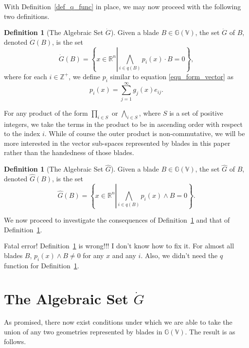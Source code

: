 \documentclass{birkjour}
\theoremstyle{definition}
\newtheorem{defn}[thm]{Definition}
\theoremstyle{remark}
\numberwithin{equation}{section}
\newcommand{\G}{\mathbb{G}}
\newcommand{\V}{\mathbb{V}}
\newcommand{\R}{\mathbb{R}}
\newcommand{\Z}{\mathbb{Z}}
\newcommand{\Gi}{\dot{G}}
\newcommand{\Go}{\hat{G}}
\begin{document}
With Definition~\ref{def_q_func} in place, we may now proceed with the following two definitions.

\begin{defn}[The Algebraic Set $\Gi$]\label{def_gi}
Given a blade $B\in\G(\V)$, the set $\Gi$ of $B$, denoted $\Gi(B)$, is the set
\begin{equation}
\Gi(B) = \left\{x\in\R^n\left|\bigwedge_{i\in q(B)} p_i(x)\cdot B=0\right.\right\},
\end{equation}
where for each $i\in\Z^+$, we define $p_i$ similar to equation \eqref{equ_form_vector} as
\begin{equation}\label{equ_pi_func}
p_i(x) = \sum_{j=1}^\infty g_j(x)e_{ij}.
\end{equation}
\end{defn}
For any product of the form $\prod_{i\in S}$ or $\bigwedge_{i\in S}$, where $S$ is
a set of positive integers, we take the terms in the product to be in ascending order
with respect to the index $i$.  While of course the outer product is non-commutative,
we will be more interested in the vector sub-spaces represented by blades in this
paper rather than the handedness of those blades.

\begin{defn}[The Algebraic Set $\Go$]\label{def_go}
Given a blade $B\in\G(\V)$, the set $\Go$ of $B$, denoted $\Go(B)$, is the set
\begin{equation}
\Go(B) = \left\{x\in\R^n\left|\bigwedge_{i\in q(B)}p_i(x)\wedge B=0\right.\right\}.
\end{equation}
\end{defn}

We now proceed to investigate the consequences of Definition~\ref{def_gi}
and that of Definition~\ref{def_go}.

Fatal error!  Definition~\ref{def_go} is wrong!!!  I don't know how
to fix it.  For almost all blades $B$, $p_i(x)\wedge B\neq 0$ for any $x$ and any $i$.
Also, we didn't need the $q$ function for Definition~\ref{def_gi}.

\section{The Algebraic Set $\Gi$}

As promised, there now exist conditions under which we are able to take the
union of any two geometries represented by blades in $\G(\V)$.  The result is
as follows.
\end{document}
